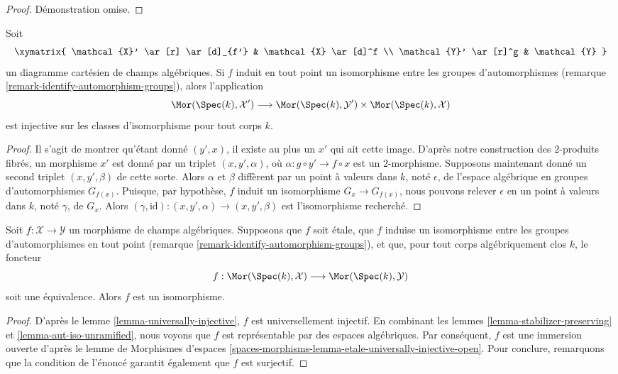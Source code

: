\begin{proof}
Démonstration omise.
\end{proof}

\begin{lemma}
\label{lemma-stabilizer-preserving-points-cartesian}
Soit
$$
\xymatrix{
\mathcal{X}' \ar[r] \ar[d]_{f'} & \mathcal{X} \ar[d]^f \\
\mathcal{Y}' \ar[r]^g & \mathcal{Y}
}
$$
un diagramme cartésien de champs algébriques. Si $f$ induit en tout point un isomorphisme
entre les groupes d'automorphismes
(remarque \ref{remark-identify-automorphism-groups}),
alors l'application
$$
\Mor(\Spec(k), \mathcal{X}')
\longrightarrow
\Mor(\Spec(k), \mathcal{Y}') \times \Mor(\Spec(k), \mathcal{X})
$$
est injective sur les classes d'isomorphisme pour tout corps $k$.
\end{lemma}

\begin{proof}
Il s'agit de montrer qu'étant donné $(y', x)$, il existe au plus un $x'$
qui ait cette image.
D'après notre construction des $2$-produits fibrés, un morphisme
$x'$ est donné par un triplet $(x, y', \alpha)$,
où $\alpha : g \circ y' \to f \circ x$ est un $2$-morphisme.
Supposons maintenant donné un second triplet $(x, y', \beta)$ de cette sorte.
Alors $\alpha$ et $\beta$ diffèrent par un point à valeurs dans $k$, noté
$\epsilon$, de l'espace algébrique en groupes d'automorphismes $G_{f(x)}$.
Puisque, par hypothèse, $f$ induit un isomorphisme $G_x \to G_{f(x)}$,
nous pouvons relever $\epsilon$ en un point à valeurs dans $k$, noté
$\gamma$, de $G_x$. Alors $(\gamma, \text{id}) : (x, y', \alpha) \to
(x, y', \beta)$ est l'isomorphisme recherché.
\end{proof}

\begin{lemma}
\label{lemma-etale-iso}
Soit $f : \mathcal{X} \to \mathcal{Y}$ un morphisme de champs algébriques.
Supposons que $f$ soit \'etale, que $f$ induise un isomorphisme
entre les groupes d'automorphismes en tout point
(remarque \ref{remark-identify-automorphism-groups}),
et que, pour tout corps algébriquement clos $k$, le foncteur
$$
f : \Mor(\Spec(k), \mathcal{X}) \longrightarrow \Mor(\Spec(k), \mathcal{Y})
$$
soit une équivalence. Alors $f$ est un isomorphisme.
\end{lemma}

\begin{proof}
D'après le lemme \ref{lemma-universally-injective}, $f$ est
universellement injectif. En combinant les
lemmes \ref{lemma-stabilizer-preserving} et
\ref{lemma-aut-iso-unramified},
nous voyons que $f$ est représentable par des espaces algébriques.
Par conséquent, $f$ est une immersion ouverte d'après le lemme de Morphismes d'espaces
\ref{spaces-morphisms-lemma-etale-universally-injective-open}.
Pour conclure, remarquons que la condition de l'énoncé garantit également
que $f$ est surjectif.
\end{proof}






